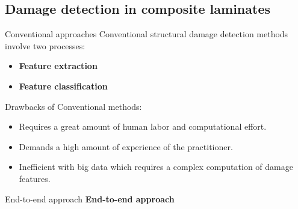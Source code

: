 \documentclass[10pt,aspectratio=169]{beamer} %
\begin{document}
\subsection{Damage detection in composite laminates}
\begin{frame}{Conventional approaches}
	Conventional structural damage detection methods involve two processes:
	\begin{itemize}
		\item \textbf{Feature extraction}
		\item \textbf{Feature classification}
	\end{itemize}
		Drawbacks of Conventional methods:
	\begin{itemize}
		\item Requires a great amount of human labor and computational effort.
		\item Demands a high amount of experience of the practitioner.
		\item Inefficient with big data which requires a complex computation of damage features.  
	\end{itemize}
\end{frame}
\setcounter{subfigure}{0}
\begin{frame}{End-to-end approach}
	\centering
	\textbf{End-to-end approach} 
	\par\medskip
\end{frame}
\end{document}
